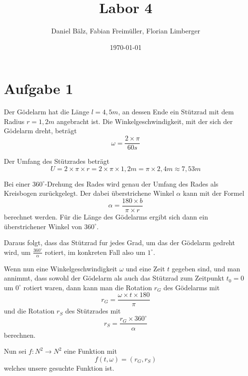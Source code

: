 \documentclass[a4paper,12pt]{article}
\begin{document}
\title{Labor 4}
\author{Daniel Bälz, Fabian Freimüller, Florian Limberger}
\date{\today}

\maketitle

\section{Aufgabe 1}

Der Gödelarm hat die Länge $l=4,5m$, an dessen Ende ein Stützrad mit dem Radius $r=1,2m$ angebracht ist. Die Winkelgeschwindigkeit, mit der sich der Gödelarm dreht, beträgt
$$\omega = \frac{2 \times \pi}{60s}$$

Der Umfang des Stützrades beträgt
$$U = 2 \times \pi \times r = 2 \times \pi \times 1,2m = \pi \times 2,4m \approx 7,53m$$

Bei einer $360^{\circ}$-Drehung des Rades wird genau der Umfang des Rades als Kreisbogen zurückgelegt. Der dabei überstrichene Winkel $\alpha$ kann mit der Formel
$$\alpha = \frac{180 \times b}{\pi \times r}$$
berechnet werden. Für die Länge des Gödelarms ergibt sich dann ein überstrichener Winkel von $360^{\circ}$.

Daraus folgt, dass das Stützrad fur jedes Grad, um das der Gödelarm gedreht wird, um $\frac{360^{\circ}}{\alpha}$ rotiert, im konkreten Fall also um $1^{\circ}$.

Wenn nun eine Winkelgeschwindigkeit $\omega$ und eine Zeit $t$ gegeben sind, und man annimmt, dass sowohl der Gödelarm als auch das Stützrad zum Zeitpunkt $t_{0} = 0$ um $0^{\circ}$ rotiert waren, dann kann man die Rotation $r_{G}$ des Gödelarms mit
$$r_{G} = \frac{\omega \times t \times 180}{\pi}$$
und die Rotation $r_{S}$ des Stützrades mit
$$r_{S} = \frac{r_{G} \times 360^{\circ}}{\alpha}$$
berechnen.

Nun sei $f: N^2 \rightarrow N^2$ eine Funktion mit
$$f(t, \omega) = (r_{G}, r_{S})$$
welches unsere gesuchte Funktion ist.
\end{document}
